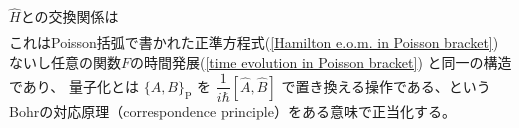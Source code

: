 $\hat{H}$との交換関係は
\begin{align}
    [F(\{ \hat{q} \},\{ \hat{p} \}, t), \hat{H}]
    \label{Hamiltonian as time translation generator}
\end{align}
これはPoisson括弧で書かれた正準方程式(\ref{Hamilton e.o.m. in Poisson bracket})
ないし任意の関数$F$の時間発展(\ref{time evolution in Poisson bracket})
と同一の構造であり、
量子化とは
$\{A, B\}_{ \mathrm{P} }$
を
$\dfrac{1}{i\hbar} [\hat{A}, \hat{B}]$
で置き換える操作である、という
Bohrの対応原理（correspondence principle）をある意味で正当化する。
